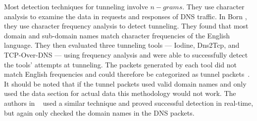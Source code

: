 Most detection techniques for tunneling involve $n-grams$.
They use character analysis to examine the data in requests and responses of DNS traffic.
In Born \etal{}, they use character frequency analysis to detect tunneling.
They found that most domain and sub-domain names match character frequencies of the English language.
They then evaluated three tunneling tools --- Iodine, Dns2Tcp, and TCP-Over-DNS --- using frequency
analysis and were able to successfully detect the tools' attempts at tunneling.
The packets generated by each tool did not match English frequencies and could therefore be
categorized as tunnel packets~\cite{tunnels}.
It should be noted that if the tunnel packets used valid domain names and only used the data section
for actual data this methodology would not work.
The authors in ~\cite{bigram} used a similar technique and proved successful detection in real-time,
but again only checked the domain names in the DNS packets.
